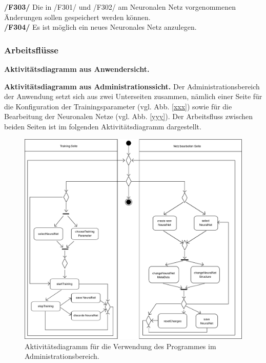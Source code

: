 \textbf{/F303/} Die in /F301/ und /F302/ am Neuronalen Netz vorgenommenen Änderungen sollen gespeichert werden können.\\[-0.2cm]

\textbf{/F304/} Es ist möglich ein neues Neuronales Netz anzulegen.\\[-0.2cm]


\subsubsection{Arbeitsflüsse}

\textbf{Aktivitätsdiagramm aus Anwendersicht.}

\textbf{Aktivitätsdiagramm aus Administrationssicht.} Der Administrationsbereich der Anwendung setzt sich aus zwei Unterseiten zusammen, nämlich einer Seite für die Konfiguration der Trainingsparameter (vgl. Abb. \ref{xxx}) sowie für die Bearbeitung der Neuronalen Netze (vgl. Abb. \ref{yyy}). Der Arbeitsfluss zwischen beiden Seiten ist im folgenden Aktivitätsdiagramm dargestellt.

\begin{figure}[H]
\begin{center}
\includegraphics[width=\textwidth]{Abbildungen/UML/jan/trainingConfigAD.png}
\caption{Aktivitätsdiagramm für die Verwendung des Programmes im Administrationsbereich.}
\label{fig_trainingConfigAD}
\end{center}
\end{figure}


